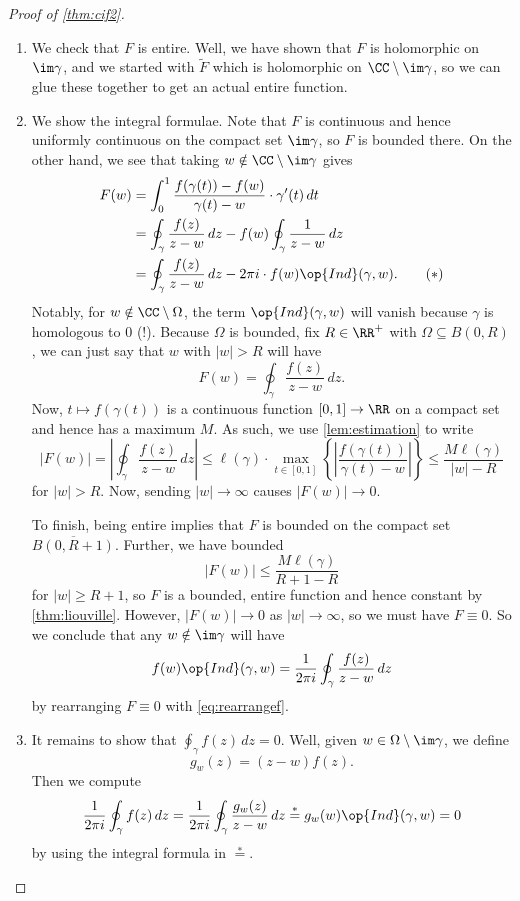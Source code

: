 \documentclass[../notes.tex]{subfiles}
\begin{document}
\begin{proof}[Proof of \autoref{thm:cif2}]
\begin{enumerate}
		\item We check that $F$ is entire. Well, we have shown that $F$ is holomorphic on $\im\gamma$, and we started with $\widetilde F$ which is holomorphic on $\CC\setminus\im\gamma$, so we can glue these together to get an actual entire function.

		\item We show the integral formulae. Note that $F$ is continuous and hence uniformly continuous on the compact set $\im\gamma$, so $F$ is bounded there. On the other hand, we see that taking $w\notin\CC\setminus\im\gamma$ gives
		\begin{align*}
			F(w) &= \int_0^1\frac{f(\gamma(t))-f(w)}{\gamma(t)-w}\cdot\gamma'(t)\,dt \\
			&= \oint_\gamma\frac{f(z)}{z-w}\,dz-f(w)\oint_\gamma\frac1{z-w}\,dz \\
			&= \oint_\gamma\frac{f(z)}{z-w}\,dz-2\pi i\cdot f(w)\op{Ind}(\gamma,w).\tag{$*$}\label{eq:rearrangef}
		\end{align*}
		Notably, for $w\notin\CC\setminus\Omega$, the term $\op{Ind}(\gamma,w)$ will vanish because $\gamma$ is homologous to $0$ (!). Because $\Omega$ is bounded, fix $R\in\RR^+$ with $\Omega\subseteq B(0,R)$, we can just say that $w$ with $|w|>R$ will have
		\[F(w)=\oint_\gamma\frac{f(z)}{z-w}\,dz.\]
		Now, $t\mapsto f(\gamma(t))$ is a continuous function $[0,1]\to\RR$ on a compact set and hence has a maximum $M$. As such, we use \autoref{lem:estimation} to write
		\[|F(w)|=\left|\oint_\gamma\frac{f(z)}{z-w}\,dz\right|\le\ell(\gamma)\cdot\max_{t\in[0,1]}\left\{\left|\frac{f(\gamma(t))}{\gamma(t)-w}\right|\right\}\le\frac{M\ell(\gamma)}{|w|-R}\]
		for $|w|>R$. Now, sending $|w|\to\infty$ causes $|F(w)|\to0$.

		To finish, being entire implies that $F$ is bounded on the compact set $\overline{B(0,R+1)}$. Further, we have bounded
		\[|F(w)|\le\frac{M\ell(\gamma)}{R+1-R}\]
		for $|w|\ge R+1$, so $F$ is a bounded, entire function and hence constant by \autoref{thm:liouville}. However, $|F(w)|\to0$ as $|w|\to\infty$, so we must have $F\equiv0$. So we conclude that any $w\notin\im\gamma$ will have
		\[f(w)\op{Ind}(\gamma,w)=\frac1{2\pi i}\oint_\gamma\frac{f(z)}{z-w}\,dz\]
		by rearranging $F\equiv0$ with \autoref{eq:rearrangef}.

		\item It remains to show that $\oint_\gamma f(z)\,dz=0$. Well, given $w\in\Omega\setminus\im\gamma$, we define
		\[g_w(z)=(z-w)f(z).\]
		Then we compute
		\[\frac1{2\pi i}\oint_\gamma f(z)\,dz=\frac1{2\pi i}\oint_\gamma\frac{g_w(z)}{z-w}\,dz\stackrel*=g_w(w)\op{Ind}(\gamma,w)=0\]
		by using the integral formula in $\stackrel*=$.
		\qedhere
	\end{enumerate}
\end{proof}
\end{document}
